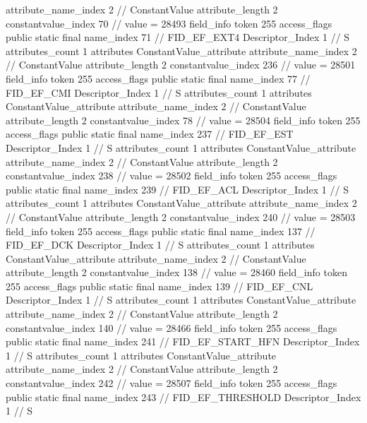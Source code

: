 {{{{{{{					attribute_name_index	2		// ConstantValue
					attribute_length	2
					constantvalue_index	70		// value = 28493
				}
				}
			}
			field_info {
				token	255
				access_flags	public static final
				name_index	71		// FID_EF_EXT4
				Descriptor_Index	1		// S
				attributes_count	1
				attributes {
				ConstantValue_attribute {
					attribute_name_index	2		// ConstantValue
					attribute_length	2
					constantvalue_index	236		// value = 28501
				}
				}
			}
			field_info {
				token	255
				access_flags	public static final
				name_index	77		// FID_EF_CMI
				Descriptor_Index	1		// S
				attributes_count	1
				attributes {
				ConstantValue_attribute {
					attribute_name_index	2		// ConstantValue
					attribute_length	2
					constantvalue_index	78		// value = 28504
				}
				}
			}
			field_info {
				token	255
				access_flags	public static final
				name_index	237		// FID_EF_EST
				Descriptor_Index	1		// S
				attributes_count	1
				attributes {
				ConstantValue_attribute {
					attribute_name_index	2		// ConstantValue
					attribute_length	2
					constantvalue_index	238		// value = 28502
				}
				}
			}
			field_info {
				token	255
				access_flags	public static final
				name_index	239		// FID_EF_ACL
				Descriptor_Index	1		// S
				attributes_count	1
				attributes {
				ConstantValue_attribute {
					attribute_name_index	2		// ConstantValue
					attribute_length	2
					constantvalue_index	240		// value = 28503
				}
				}
			}
			field_info {
				token	255
				access_flags	public static final
				name_index	137		// FID_EF_DCK
				Descriptor_Index	1		// S
				attributes_count	1
				attributes {
				ConstantValue_attribute {
					attribute_name_index	2		// ConstantValue
					attribute_length	2
					constantvalue_index	138		// value = 28460
				}
				}
			}
			field_info {
				token	255
				access_flags	public static final
				name_index	139		// FID_EF_CNL
				Descriptor_Index	1		// S
				attributes_count	1
				attributes {
				ConstantValue_attribute {
					attribute_name_index	2		// ConstantValue
					attribute_length	2
					constantvalue_index	140		// value = 28466
				}
				}
			}
			field_info {
				token	255
				access_flags	public static final
				name_index	241		// FID_EF_START_HFN
				Descriptor_Index	1		// S
				attributes_count	1
				attributes {
				ConstantValue_attribute {
					attribute_name_index	2		// ConstantValue
					attribute_length	2
					constantvalue_index	242		// value = 28507
				}
				}
			}
			field_info {
				token	255
				access_flags	public static final
				name_index	243		// FID_EF_THRESHOLD
				Descriptor_Index	1		// S
}}}}}
